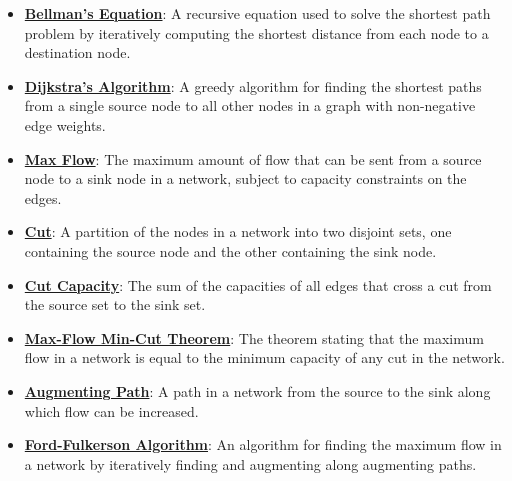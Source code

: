 \documentclass{article}%
\begin{document}
\begin{itemize}[leftmargin=*]
\item \href{https://www.math.purdue.edu/~yipn/421/2024-11-14-NetAppls.pdf#page=16}{\textbf{Bellman's Equation}}: A recursive equation used to solve the shortest path problem by iteratively computing the shortest distance from each node to a destination node.%
\item \href{https://www.math.purdue.edu/~yipn/421/2024-11-14-NetAppls.pdf#page=20}{\textbf{Dijkstra's Algorithm}}: A greedy algorithm for finding the shortest paths from a single source node to all other nodes in a graph with non-negative edge weights.%
\item \href{https://www.math.purdue.edu/~yipn/421/2024-11-19-MaxFlowMinCut.pdf#page=1}{\textbf{Max Flow}}: The maximum amount of flow that can be sent from a source node to a sink node in a network, subject to capacity constraints on the edges.%
\item \href{https://www.math.purdue.edu/~yipn/421/2024-11-19-MaxFlowMinCut.pdf#page=2}{\textbf{Cut}}: A partition of the nodes in a network into two disjoint sets, one containing the source node and the other containing the sink node.%
\item \href{https://www.math.purdue.edu/~yipn/421/2024-11-19-MaxFlowMinCut.pdf#page=2}{\textbf{Cut Capacity}}: The sum of the capacities of all edges that cross a cut from the source set to the sink set.%
\item \href{https://www.math.purdue.edu/~yipn/421/2024-11-19-MaxFlowMinCut.pdf#page=4}{\textbf{Max-Flow Min-Cut Theorem}}: The theorem stating that the maximum flow in a network is equal to the minimum capacity of any cut in the network.%
\item \href{https://www.math.purdue.edu/~yipn/421/2024-11-19-MaxFlowMinCut.pdf#page=10}{\textbf{Augmenting Path}}: A path in a network from the source to the sink along which flow can be increased.%
\item \href{https://www.math.purdue.edu/~yipn/421/2024-11-19-MaxFlowMinCut.pdf#page=10}{\textbf{Ford-Fulkerson Algorithm}}: An algorithm for finding the maximum flow in a network by iteratively finding and augmenting along augmenting paths.%
\end{itemize}

%
\end{document}
